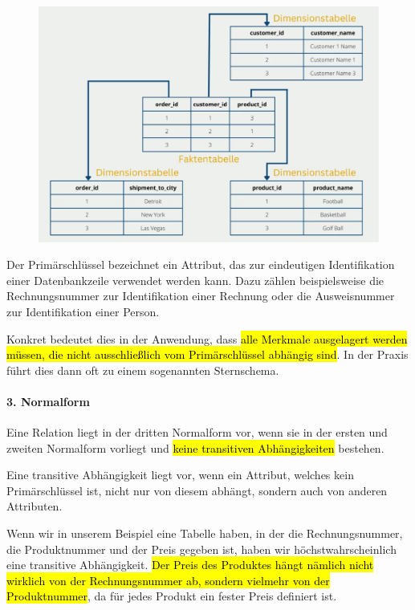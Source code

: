\begin{figure}
	\includegraphics[scale=.26]{Bilder/SternSchemaDB.png}
\end{figure}

Der Primärschlüssel bezeichnet ein Attribut, das zur eindeutigen Identifikation einer Datenbankzeile verwendet werden kann. Dazu zählen beispielsweise die Rechnungsnummer zur Identifikation einer Rechnung oder die Ausweisnummer zur Identifikation einer Person.

\vspace{1em}

Konkret bedeutet dies in der Anwendung, dass \hl{alle Merkmale ausgelagert werden müssen, die nicht ausschließlich vom Primärschlüssel abhängig sind}. In der Praxis führt dies dann oft zu einem sogenannten Sternschema.


\paragraph{3. Normalform} Eine Relation liegt in der dritten Normalform vor, wenn sie in der ersten und zweiten Normalform vorliegt und \hl{keine transitiven Abhängigkeiten} bestehen.

Eine transitive Abhängigkeit liegt vor, wenn ein Attribut, welches kein Primärschlüssel ist, nicht nur von diesem abhängt, sondern auch von anderen Attributen.

Wenn wir in unserem Beispiel eine Tabelle haben, in der die Rechnungsnummer, die Produktnummer und der Preis gegeben ist, haben wir höchstwahrscheinlich eine transitive Abhängigkeit. \hl{Der Preis des Produktes hängt nämlich nicht wirklich von der Rechnungsnummer ab, sondern vielmehr von der Produktnummer}, da für jedes Produkt ein fester Preis definiert ist.

